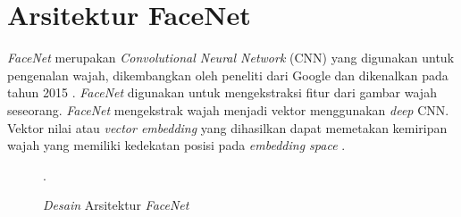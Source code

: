 
\section{Arsitektur FaceNet}
\par \textit{FaceNet} merupakan \textit{Convolutional Neural Network} (CNN) yang digunakan untuk pengenalan wajah, dikembangkan oleh peneliti dari Google dan dikenalkan pada tahun 2015 \citep{jose2019}. \textit{FaceNet} digunakan untuk mengekstraksi fitur dari gambar wajah seseorang. \textit{FaceNet} mengekstrak wajah menjadi vektor menggunakan \textit{deep} CNN. Vektor nilai atau \textit{vector embedding} yang dihasilkan dapat memetakan kemiripan wajah yang memiliki kedekatan posisi pada \textit{embedding space} \citep{rajagede2021}.

\begin{figure}[H]
\centering
{}
\caption{\textit{Desain} Arsitektur \textit{FaceNet}}.
\label{dig_facenet}
\end{figure}

\fancyhf{} 
\fancyfoot[R]{\thepage}

